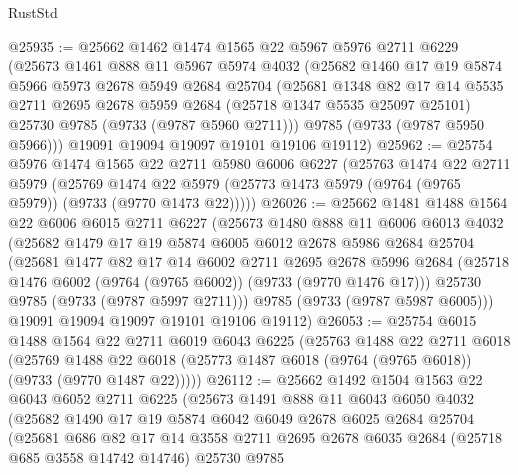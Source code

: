 \begin{lexlean}{RustStd}
\begin{coremodule}
@25935 := @25662
    @1462
    @1474
    @1565
    @22
    @5967
    @5976
    @2711
    @6229
    (@25673
      @1461
      @888
      @11
      @5967
      @5974
      @4032
      (@25682
        @1460
        @17
        @19
        @5874
        @5966
        @5973
        @2678
        @5949
        @2684
        @25704
        (@25681
          @1348
          @82
          @17
          @14
          @5535
          @2711
          @2695
          @2678
          @5959
          @2684
          (@25718 @1347 @5535 @25097 @25101)
          @25730
          @9785
          (@9733 (@9787 @5960 @2711)))
        @9785
        (@9733 (@9787 @5950 @5966)))
      @19091
      @19094
      @19097
      @19101
      @19106
      @19112)
@25962 := @25754
    @5976
    @1474
    @1565
    @22
    @2711
    @5980
    @6006
    @6227
    (@25763
      @1474
      @22
      @2711
      @5979
      (@25769 @1474 @22 @5979 (@25773 @1473 @5979 (@9764 (@9765 @5979)) (@9733 (@9770 @1473 @22)))))
@26026 := @25662
    @1481
    @1488
    @1564
    @22
    @6006
    @6015
    @2711
    @6227
    (@25673
      @1480
      @888
      @11
      @6006
      @6013
      @4032
      (@25682
        @1479
        @17
        @19
        @5874
        @6005
        @6012
        @2678
        @5986
        @2684
        @25704
        (@25681
          @1477
          @82
          @17
          @14
          @6002
          @2711
          @2695
          @2678
          @5996
          @2684
          (@25718 @1476 @6002 (@9764 (@9765 @6002)) (@9733 (@9770 @1476 @17)))
          @25730
          @9785
          (@9733 (@9787 @5997 @2711)))
        @9785
        (@9733 (@9787 @5987 @6005)))
      @19091
      @19094
      @19097
      @19101
      @19106
      @19112)
@26053 := @25754
    @6015
    @1488
    @1564
    @22
    @2711
    @6019
    @6043
    @6225
    (@25763
      @1488
      @22
      @2711
      @6018
      (@25769 @1488 @22 @6018 (@25773 @1487 @6018 (@9764 (@9765 @6018)) (@9733 (@9770 @1487 @22)))))
@26112 := @25662
    @1492
    @1504
    @1563
    @22
    @6043
    @6052
    @2711
    @6225
    (@25673
      @1491
      @888
      @11
      @6043
      @6050
      @4032
      (@25682
        @1490
        @17
        @19
        @5874
        @6042
        @6049
        @2678
        @6025
        @2684
        @25704
        (@25681
          @686
          @82
          @17
          @14
          @3558
          @2711
          @2695
          @2678
          @6035
          @2684
          (@25718 @685 @3558 @14742 @14746)
          @25730
          @9785

\end{coremodule}
\end{lexlean}
